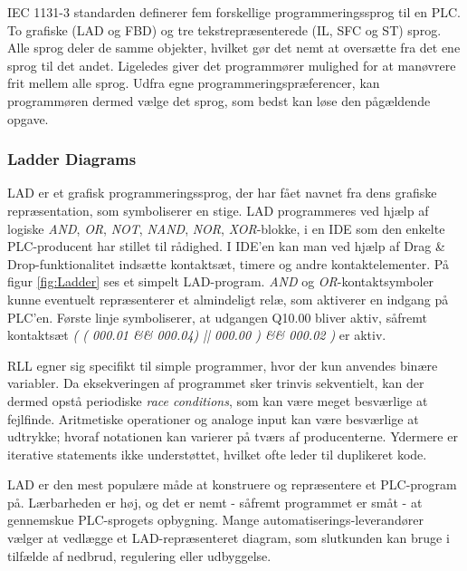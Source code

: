 \noindent IEC 1131-3 standarden definerer fem forskellige programmeringssprog til en PLC. To grafiske (LAD og FBD) og tre tekstrepræsenterede (IL, SFC og ST) sprog. Alle sprog deler de samme objekter, hvilket gør det nemt at oversætte fra det ene sprog til det andet. Ligeledes giver det programmører mulighed for at manøvrere frit mellem alle sprog. Udfra egne programmeringspræferencer, kan programmøren dermed vælge det sprog, som bedst kan løse den pågældende opgave.

\subsubsection{Ladder Diagrams}
LAD er et grafisk programmeringssprog, der har fået navnet fra dens grafiske repræsentation, som symboliserer en stige. LAD programmeres ved hjælp af logiske \textit{AND}, \textit{OR}, \textit{NOT}, \textit{NAND}, \textit{NOR}, \textit{XOR}-blokke, i en IDE som den enkelte PLC-producent har stillet til rådighed. I IDE'en kan man ved hjælp af Drag \& Drop-funktionalitet indsætte kontaktsæt, timere og andre kontaktelementer. På figur \ref{fig:Ladder} ses et simpelt LAD-program. \textit{AND} og \textit{OR}-kontaktsymboler kunne eventuelt repræsenterer et almindeligt relæ, som aktiverer en indgang på PLC'en. Første linje symboliserer, at udgangen Q10.00 bliver aktiv, såfremt kontaktsæt \textit{( ( 000.01 \&\& 000.04) || 000.00 ) \&\& 000.02 )} er aktiv.


\noindent RLL egner sig specifikt til simple programmer, hvor der kun anvendes binære variabler. Da eksekveringen af programmet sker trinvis sekventielt, kan der dermed opstå periodiske \textit{race conditions}, som kan være meget besværlige at fejlfinde. Aritmetiske operationer og analoge input kan være besværlige at udtrykke; hvoraf notationen kan varierer på tværs af producenterne. Ydermere er iterative statements ikke understøttet, hvilket ofte leder til duplikeret kode.

\noindent LAD er den mest populære måde at konstruere og repræsentere et PLC-program på. Lærbarheden er høj, og det er nemt - såfremt programmet er småt - at gennemskue PLC-sprogets opbygning. Mange automatiserings-leverandører vælger at vedlægge et LAD-repræsenteret diagram, som slutkunden kan bruge i tilfælde af nedbrud, regulering eller udbyggelse. \cite{FDB_desc}


